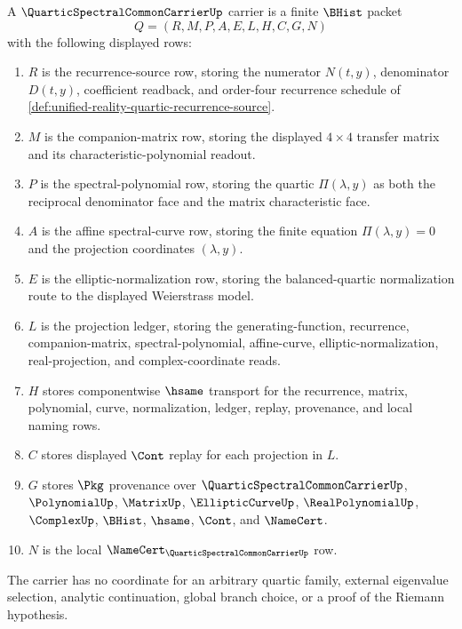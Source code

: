 \begin{definition}
\label{def:quartic-spectral-common-carrier}
A $\QuarticSpectralCommonCarrierUp$ carrier is a finite $\BHist$ packet
$$
Q=(R,M,P,A,E,L,H,C,G,N)
$$
with the following displayed rows:
\begin{enumerate}
\item $R$ is the recurrence-source row, storing the numerator $N(t,y)$, denominator $D(t,y)$, coefficient readback, and order-four recurrence schedule of \autoref{def:unified-reality-quartic-recurrence-source}.
\item $M$ is the companion-matrix row, storing the displayed $4\times4$ transfer matrix and its characteristic-polynomial readout.
\item $P$ is the spectral-polynomial row, storing the quartic $\Pi(\lambda,y)$ as both the reciprocal denominator face and the matrix characteristic face.
\item $A$ is the affine spectral-curve row, storing the finite equation $\Pi(\lambda,y)=0$ and the projection coordinates $(\lambda,y)$.
\item $E$ is the elliptic-normalization row, storing the balanced-quartic normalization route to the displayed Weierstrass model.
\item $L$ is the projection ledger, storing the generating-function, recurrence, companion-matrix, spectral-polynomial, affine-curve, elliptic-normalization, real-projection, and complex-coordinate reads.
\item $H$ stores componentwise $\hsame$ transport for the recurrence, matrix, polynomial, curve, normalization, ledger, replay, provenance, and local naming rows.
\item $C$ stores displayed $\Cont$ replay for each projection in $L$.
\item $G$ stores $\Pkg$ provenance over $\QuarticSpectralCommonCarrierUp$, $\PolynomialUp$, $\MatrixUp$, $\EllipticCurveUp$, $\RealPolynomialUp$, $\ComplexUp$, $\BHist$, $\hsame$, $\Cont$, and $\NameCert$.
\item $N$ is the local $\NameCert_{\QuarticSpectralCommonCarrierUp}$ row.
\end{enumerate}
The carrier has no coordinate for an arbitrary quartic family, external eigenvalue selection, analytic continuation, global branch choice, or a proof of the Riemann hypothesis.
\end{definition}

